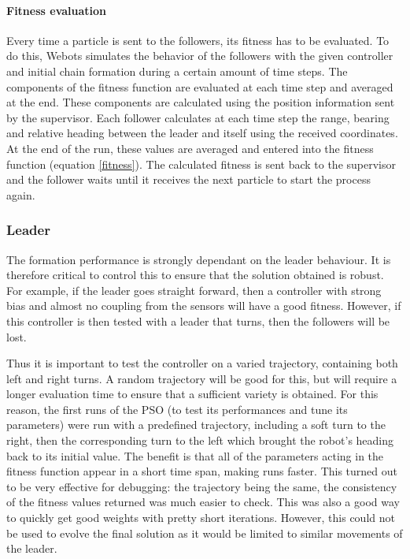 \documentclass[a4paper, 10pt, conference]{ieeeconf}      %
\begin{document}
\paragraph{Fitness evaluation}
Every time a particle is sent to the followers, its fitness has to be evaluated. To do this, Webots simulates the behavior of the followers with the given controller and initial chain formation during a certain amount of time steps. The components of the fitness function are evaluated at each time step and averaged at the end. These components are calculated using the position information sent by the supervisor. Each follower calculates at each time step the range, bearing and relative heading between the leader and itself using the received coordinates. At the end of the run, these values are averaged and entered into the fitness function (equation \ref{fitness}). The calculated fitness is sent back to the supervisor and the follower waits until it receives the next particle to start the process again.

\subsubsection{Leader}
The formation performance is strongly dependant on the leader behaviour. It is therefore critical to control this to ensure that the solution obtained is robust. For example, if the leader goes straight forward, then a controller with strong bias and almost no coupling from the sensors will have a good fitness. However, if this controller is then tested with a leader that turns, then the followers will be lost. 

Thus it is important to test the controller on a varied trajectory, containing both left and right turns. A random trajectory will be good for this, but will require a longer evaluation time to ensure that a sufficient variety is obtained. For this reason, the first runs of the PSO (to test its performances and tune its parameters) were run with a predefined trajectory, including a soft turn to the right, then the corresponding turn to the left which brought the robot's heading back to its initial value. The benefit is that all of the parameters acting in the fitness function appear in a short time span, making runs faster. This turned out to be very effective for debugging: the trajectory being the same, the consistency of the fitness values returned was much easier to check. This was also a good way to quickly get good weights with pretty short iterations. However, this could not be used to evolve the final solution as it would be limited to similar movements of the leader.
\end{document}
